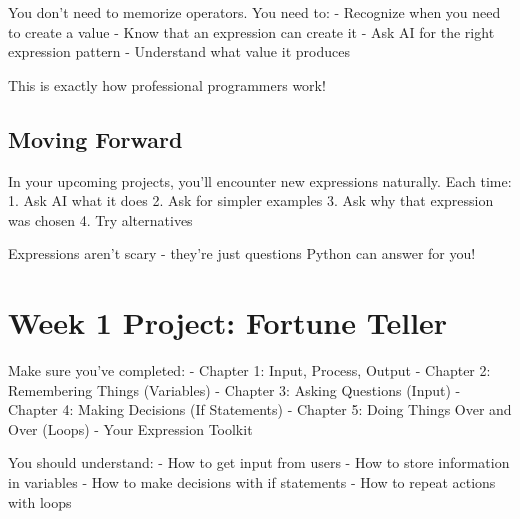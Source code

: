 \documentclass[
  letterpaper,
  DIV=11,
  numbers=noendperiod,
  oneside]{scrreprt}
\begin{document}
\begin{tcolorbox}[enhanced jigsaw, opacityback=0, colback=white, colframe=quarto-callout-tip-color-frame, breakable, titlerule=0mm, coltitle=black, rightrule=.15mm, colbacktitle=quarto-callout-tip-color!10!white, left=2mm, bottomtitle=1mm, bottomrule=.15mm, title=\textcolor{quarto-callout-tip-color}{\faLightbulb}\hspace{0.5em}{Expression Confidence}, opacitybacktitle=0.6, toptitle=1mm, leftrule=.75mm, arc=.35mm, toprule=.15mm]

You don't need to memorize operators. You need to: - Recognize when you
need to create a value - Know that an expression can create it - Ask AI
for the right expression pattern - Understand what value it produces

This is exactly how professional programmers work!

\end{tcolorbox}

\section{Moving Forward}\label{moving-forward}

In your upcoming projects, you'll encounter new expressions naturally.
Each time: 1. Ask AI what it does 2. Ask for simpler examples 3. Ask why
that expression was chosen 4. Try alternatives

Expressions aren't scary - they're just questions Python can answer for
you!

\chapter{Week 1 Project: Fortune
Teller}\label{sec-project-fortune-teller}

\begin{tcolorbox}[enhanced jigsaw, opacityback=0, colback=white, colframe=quarto-callout-important-color-frame, breakable, titlerule=0mm, coltitle=black, rightrule=.15mm, colbacktitle=quarto-callout-important-color!10!white, left=2mm, bottomtitle=1mm, bottomrule=.15mm, title=\textcolor{quarto-callout-important-color}{\faExclamation}\hspace{0.5em}{Before You Start}, opacitybacktitle=0.6, toptitle=1mm, leftrule=.75mm, arc=.35mm, toprule=.15mm]

Make sure you've completed: - Chapter 1: Input, Process, Output -
Chapter 2: Remembering Things (Variables) - Chapter 3: Asking Questions
(Input) - Chapter 4: Making Decisions (If Statements) - Chapter 5: Doing
Things Over and Over (Loops) - Your Expression Toolkit

You should understand: - How to get input from users - How to store
information in variables - How to make decisions with if statements -
How to repeat actions with loops

\end{tcolorbox}
\end{document}
